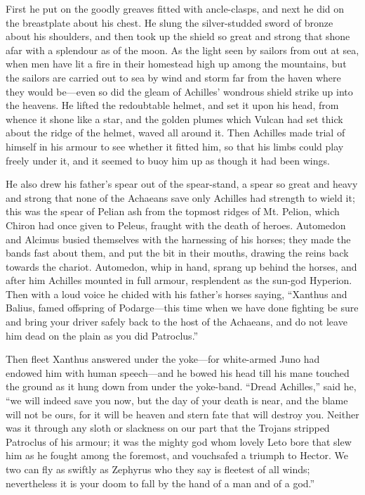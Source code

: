 First he put on the goodly greaves fitted with ancle-clasps, and next he
did on the breastplate about his chest. He slung the silver-studded sword
of bronze about his shoulders, and then took up the shield so great and
strong that shone afar with a splendour as of the moon. As the light seen
by sailors from out at sea, when men have lit a fire in their homestead
high up among the mountains, but the sailors are carried out to sea by
wind and storm far from the haven where they would be—even so did
the gleam of Achilles’ wondrous shield strike up into the heavens. He
lifted the redoubtable helmet, and set it upon his head, from whence it
shone like a star, and the golden plumes which Vulcan had set thick about
the ridge of the helmet, waved all around it. Then Achilles made trial of
himself in his armour to see whether it fitted him, so that his limbs
could play freely under it, and it seemed to buoy him up as though it had
been wings.

He also drew his father’s spear out of the spear-stand, a spear so great
and heavy and strong that none of the Achaeans save only Achilles had
strength to wield it; this was the spear of Pelian ash from the topmost
ridges of Mt. Pelion, which Chiron had once given to Peleus, fraught with
the death of heroes. Automedon and Alcimus busied themselves with the
harnessing of his horses; they made the bands fast about them, and put the
bit in their mouths, drawing the reins back towards the chariot.
Automedon, whip in hand, sprang up behind the horses, and after him
Achilles mounted in full armour, resplendent as the sun-god Hyperion. Then
with a loud voice he chided with his father’s horses saying, “Xanthus and
Balius, famed offspring of Podarge—this time when we have done
fighting be sure and bring your driver safely back to the host of the
Achaeans, and do not leave him dead on the plain as you did Patroclus.”

Then fleet Xanthus answered under the yoke—for white-armed Juno had
endowed him with human speech—and he bowed his head till his mane
touched the ground as it hung down from under the yoke-band. “Dread
Achilles,” said he, “we will indeed save you now, but the day of your
death is near, and the blame will not be ours, for it will be heaven and
stern fate that will destroy you. Neither was it through any sloth or
slackness on our part that the Trojans stripped Patroclus of his armour;
it was the mighty god whom lovely Leto bore that slew him as he fought
among the foremost, and vouchsafed a triumph to Hector. We two can fly as
swiftly as Zephyrus who they say is fleetest of all winds; nevertheless it
is your doom to fall by the hand of a man and of a god.”

